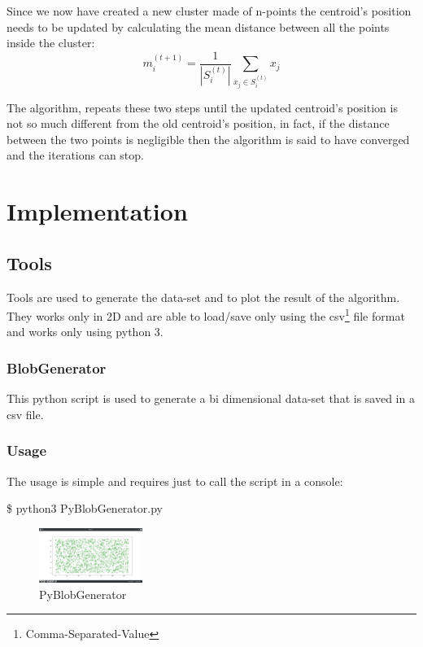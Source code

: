 \documentclass[10pt,twocolumn,letterpaper]{article}
\newenvironment{Shaded}{}{}
\newcommand{\ExtensionTok}[1]{#1}
\newcommand{\NormalTok}[1]{#1}
\begin{document}
Since we now have created a new cluster made of n-points the centroid's position needs to be updated by calculating the mean distance
between all the points inside the cluster:\newline
\begin{equation}
\label{eq:first}
m^{(t+1)}_i = \frac{1}{\left|S^{(t)}_i\right|} \sum_{x_j \in S^{(t)}_i} x_j 
\end{equation}  

The algorithm, repeats these two steps until the updated centroid's position is not so much different from the old centroid's position, 
in fact, if the distance between the two points is negligible then the algorithm is said to have converged and the iterations can stop.
\newline

\section{Implementation}
\subsection{Tools}
Tools are used to generate the data-set and to plot the result of the algorithm.\newline
They works only in 2D and are able to load/save only using the csv\footnote{Comma-Separated-Value} file format and works only
using python 3.
\subsubsection{BlobGenerator}
This python script is used to generate a bi dimensional data-set that is saved in a csv file.\newline
\subsubsection{Usage}
The usage is simple and requires just to call the script in a console:\newline
\begin{Shaded}
\begin{Highlighting}[]
\NormalTok{\$ }\ExtensionTok{python3}\NormalTok{ PyBlobGenerator.py }
\end{Highlighting}
\end{Shaded}

\begin{figure}[H]
\centering
\includegraphics[width=0.3\textwidth]{Py_Blob_Generator}
\caption{PyBlobGenerator}
\end{figure}
\end{document}
